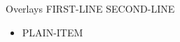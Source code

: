 \documentclass{beamer}
\begin{document}
\begin{frame}{Overlays}
	FIRST-LINE
	\pause
	SECOND-LINE
	\begin{itemize}
		\item PLAIN-ITEM
	\end{itemize}
\end{frame}
\end{document}
